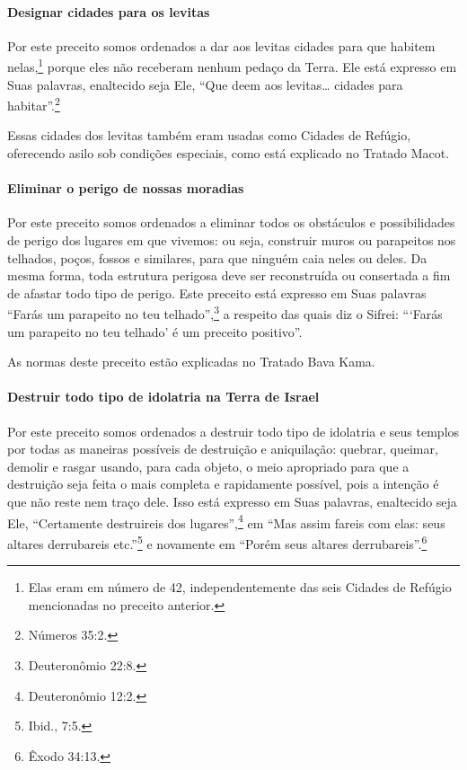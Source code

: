 \begin{multicols}{2}
\paragraph{Designar cidades para os levitas\starr}

Por este preceito somos ordenados a dar aos levitas\starr{} cidades para que
habitem nelas,\footnote{Elas eram em número de 42, independentemente das seis Cidades de
Refúgio mencionadas no preceito anterior.} porque eles não receberam nenhum
pedaço da Terra. Ele está expresso em Suas palavras, enaltecido seja
Ele, ``Que deem aos levitas\starr{}\ldots{} cidades para habitar''.\footnote{Números 35:2.}

Essas cidades dos levitas\starr{} também eram usadas como Cidades de Refúgio,
oferecendo asilo sob condições especiais, como está explicado no Tratado
Macot\starr.

\paragraph{Eliminar o perigo de nossas moradias}

Por este preceito somos ordenados a eliminar todos os obstáculos e
possibilidades de perigo dos lugares em que vivemos: ou seja, construir
muros ou parapeitos nos telhados, poços, fossos e similares, para que
ninguém caia neles ou deles. Da mesma forma, toda estrutura perigosa
deve ser reconstruída ou consertada a fim de afastar todo tipo de
perigo. Este preceito está expresso em Suas palavras ``Farás um
parapeito no teu telhado'',\footnote{Deuteronômio 22:8.}
a respeito das quais diz o Sifrei\starr: ```Farás um parapeito no teu telhado'
é um preceito positivo''.

As normas deste preceito estão explicadas no Tratado Bava Kama\starr.

\paragraph{Destruir todo tipo de idolatria na Terra de Israel}

Por este preceito somos ordenados a destruir todo tipo de idolatria e
seus templos por todas as maneiras possíveis de destruição e
aniquilação: quebrar, queimar, demolir e rasgar usando, para cada
objeto, o meio apropriado para que a destruição seja feita o mais
completa e rapidamente possível, pois a intenção é que não reste nem
traço dele. Isso está expresso em Suas palavras, enaltecido seja Ele,
``Certamente destruireis dos lugares'',\footnote{Deuteronômio 12:2.} em ``Mas
assim fareis com elas: seus altares derrubareis etc.''\footnote{Ibid., 7:5.} e
novamente em ``Porém seus altares derrubareis''.\footnote{Êxodo 34:13.}


\end{multicols}
